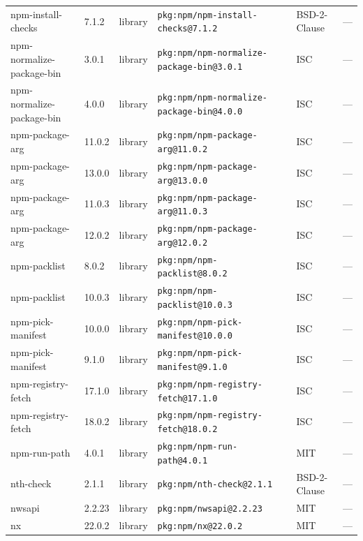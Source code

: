 \documentclass[11pt,a4paper]{article}
\begin{document}
\begin{longtable}{|p{4cm}|p{2cm}|p{1.6cm}|p{5cm}|p{1.5cm}|p{3.5cm}|}
\raggedright npm-install-checks & 7.1.2 & library & \small\texttt{pkg:npm/npm-install-checks@7.1.2} & BSD-2-Clause & \small — \\
\raggedright npm-normalize-package-bin & 3.0.1 & library & \small\texttt{pkg:npm/npm-normalize-package-bin@3.0.1} & ISC & \small — \\
\raggedright npm-normalize-package-bin & 4.0.0 & library & \small\texttt{pkg:npm/npm-normalize-package-bin@4.0.0} & ISC & \small — \\
\raggedright npm-package-arg & 11.0.2 & library & \small\texttt{pkg:npm/npm-package-arg@11.0.2} & ISC & \small — \\
\raggedright npm-package-arg & 13.0.0 & library & \small\texttt{pkg:npm/npm-package-arg@13.0.0} & ISC & \small — \\
\raggedright npm-package-arg & 11.0.3 & library & \small\texttt{pkg:npm/npm-package-arg@11.0.3} & ISC & \small — \\
\raggedright npm-package-arg & 12.0.2 & library & \small\texttt{pkg:npm/npm-package-arg@12.0.2} & ISC & \small — \\
\raggedright npm-packlist & 8.0.2 & library & \small\texttt{pkg:npm/npm-packlist@8.0.2} & ISC & \small — \\
\raggedright npm-packlist & 10.0.3 & library & \small\texttt{pkg:npm/npm-packlist@10.0.3} & ISC & \small — \\
\raggedright npm-pick-manifest & 10.0.0 & library & \small\texttt{pkg:npm/npm-pick-manifest@10.0.0} & ISC & \small — \\
\raggedright npm-pick-manifest & 9.1.0 & library & \small\texttt{pkg:npm/npm-pick-manifest@9.1.0} & ISC & \small — \\
\raggedright npm-registry-fetch & 17.1.0 & library & \small\texttt{pkg:npm/npm-registry-fetch@17.1.0} & ISC & \small — \\
\raggedright npm-registry-fetch & 18.0.2 & library & \small\texttt{pkg:npm/npm-registry-fetch@18.0.2} & ISC & \small — \\
\raggedright npm-run-path & 4.0.1 & library & \small\texttt{pkg:npm/npm-run-path@4.0.1} & MIT & \small — \\
\raggedright nth-check & 2.1.1 & library & \small\texttt{pkg:npm/nth-check@2.1.1} & BSD-2-Clause & \small — \\
\raggedright nwsapi & 2.2.23 & library & \small\texttt{pkg:npm/nwsapi@2.2.23} & MIT & \small — \\
\raggedright nx & 22.0.2 & library & \small\texttt{pkg:npm/nx@22.0.2} & MIT & \small — \\

\end{longtable}
\end{document}
